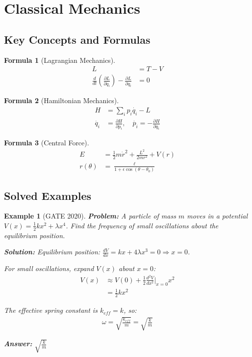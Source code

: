 \documentclass[12pt,a4paper]{article}
\newtheorem{example}{Example}[section]
\newtheorem{formula}{Formula}[section]
\newcommand{\ans}[1]{\textcolor{red!70!black}{\textbf{Answer:} #1}}
\newcommand{\sol}{\textcolor{blue!70!black}{\textbf{Solution:}}}
\begin{document}
\section{Classical Mechanics}

\subsection{Key Concepts and Formulas}

\begin{formula}[Lagrangian Mechanics]
\begin{align}
L &= T - V\\
\frac{d}{dt}\left(\frac{\partial L}{\partial \dot{q_i}}\right) - \frac{\partial L}{\partial q_i} &= 0
\end{align}
\end{formula}

\begin{formula}[Hamiltonian Mechanics]
\begin{align}
H &= \sum_i p_i \dot{q_i} - L\\
\dot{q_i} &= \frac{\partial H}{\partial p_i}, \quad \dot{p_i} = -\frac{\partial H}{\partial q_i}
\end{align}
\end{formula}

\begin{formula}[Central Force]
\begin{align}
E &= \frac{1}{2}m\dot{r}^2 + \frac{L^2}{2mr^2} + V(r)\\
r(\theta) &= \frac{\ell}{1 + \epsilon\cos(\theta - \theta_0)}
\end{align}
\end{formula}

\subsection{Solved Examples}

\begin{example}[GATE 2020]
\textbf{Problem:} A particle of mass $m$ moves in a potential $V(x) = \frac{1}{2}kx^2 + \lambda x^4$. Find the frequency of small oscillations about the equilibrium position.

\sol
Equilibrium position: $\frac{dV}{dx} = kx + 4\lambda x^3 = 0 \Rightarrow x = 0$.

For small oscillations, expand $V(x)$ about $x = 0$:
\begin{align}
V(x) &\approx V(0) + \frac{1}{2}\frac{d^2V}{dx^2}\Big|_{x=0} x^2\\
&= \frac{1}{2}kx^2
\end{align}

The effective spring constant is $k_{eff} = k$, so:
\begin{align}
\omega = \sqrt{\frac{k_{eff}}{m}} = \sqrt{\frac{k}{m}}
\end{align}

\ans{$\sqrt{\frac{k}{m}}$}
\end{example}
\end{document}
